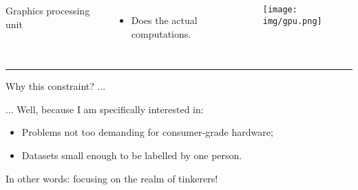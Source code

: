 \begin{frame}
\begin{columns}
Graphics processing unit
\begin{itemize}
\item Does the actual computations.
\end{itemize}
\texttt{[image: img/gpu.png]}
\end{columns}
\vspace{0.5cm}
\pause
\rule{\textwidth}{0.7pt}

\vspace{0.5cm}

Why this constraint? ...
\pause

\vspace{0.5cm}

... Well, because I am specifically interested in:
\begin{itemize}
\item Problems not too demanding for consumer-grade hardware;
\item Datasets small enough to be labelled by one person.
\end{itemize}
\pause
In other words: focusing on the realm of tinkerers!
\end{frame}
